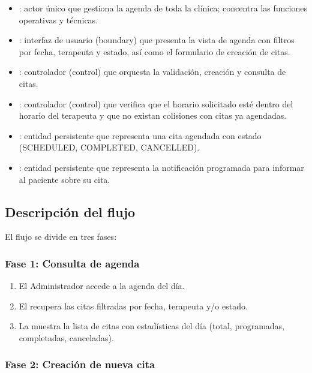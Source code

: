 \begin{itemize}
  \item {}: actor único que gestiona la agenda de toda la clínica; concentra las funciones operativas y técnicas.
  \item {}: interfaz de usuario (boundary) que presenta la vista de agenda con filtros por fecha, terapeuta y estado, así como el formulario de creación de citas.
  \item {}: controlador (control) que orquesta la validación, creación y consulta de citas.
  \item {}: controlador (control) que verifica que el horario solicitado esté dentro del horario del terapeuta y que no existan colisiones con citas ya agendadas.
  \item {}: entidad persistente que representa una cita agendada con estado (SCHEDULED, COMPLETED, CANCELLED).
  \item {}: entidad persistente que representa la notificación programada para informar al paciente sobre su cita.
\end{itemize}

\subsection{Descripción del flujo}

El flujo se divide en tres fases:

\subsubsection{Fase 1: Consulta de agenda}

\begin{enumerate}
  \item El Administrador accede a la agenda del día.
  \item El  recupera las citas filtradas por fecha, terapeuta y/o estado.
  \item La  muestra la lista de citas con estadísticas del día (total, programadas, completadas, canceladas).
\end{enumerate}

\subsubsection{Fase 2: Creación de nueva cita}

